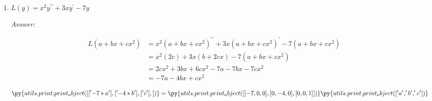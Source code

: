\documentclass[letterpaper]{article}
\newcommand{\ans}{\textit{Answer: }}
\newenvironment{question}[2][Question]{\begin{trivlist}
\item[\hskip \labelsep {\bfseries #1}\hskip \labelsep {\bfseries #2.}]}{\end{trivlist}}
\newcommand{\printobj}[1]{\py{utils.print.print_object(#1)}}
\begin{document}
\begin{question}{3.130}
\begin{enumerate}
    \item[\textbf{(e)}] $L ( y ) = x ^ { 2 } y ^ { \prime \prime } + 3 x y ^ { \prime } - 7 y$
    
    \ans 

    \begin{align*}
      L(a + bx + cx^2) 
      &= x ^ { 2 } (a + bx + cx^2) ^ { \prime \prime } + 3 x (a + bx + cx^2) ^ { \prime } - 7 (a + bx + cx^2) \\
      &= x^2 (2c) + 3x (b + 2cx) - 7(a + bx + cx^2) \\
      &= 2cx^2 + 3bx + 6cx^2 - 7a - 7bx - 7cx^2 \\
      &= -7a - 4bx + cx^2
    \end{align*}

    $$\printobj{[
      ['-7*a'],
      ['-4*b'],
      ['c'],
    ]} = \printobj{[
      [-7, 0, 0],
      [0, -4, 0],
      [0, 0, 1]
    ]} \printobj{['a', 'b', 'c']}$$

  \end{enumerate}
\end{question}
\end{document}
